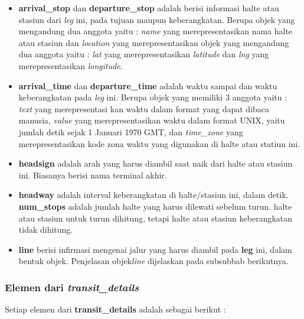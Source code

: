 \begin{itemize}
	\item \textbf{arrival\_stop} dan \textbf{departure\_stop} adalah berisi informasi halte atau stasiun dari \textit{leg} ini, pada tujuan maupun keberangkatan. Berupa objek yang mengandung dua anggota yaitu : \textit{name} yang merepresentasikan nama halte atau stasiun dan \textit{location} yang merepresentasikan objek yang mengandung dua anggota yaitu : \textit{lat} yang merepresentasikan \textit{latitude} dan \textit{lng} yang merepresentasikan \textit{longitude}.
	\item \textbf{arrival\_time} dan \textbf{departure\_time} adalah waktu sampai dan waktu keberangkatan pada \textit{leg} ini. Berupa objek yang memiliki 3 anggota yaitu : \textit{text} yang merepresentasi kan waktu dalam format yang dapat dibaca manusia, \textit{value} yang merepresentasikan waktu dalam format UNIX, yaitu jumlah detik sejak 1 Januari 1970 GMT, dan \textit{time\_zone} yang merepresentasikan kode zona waktu yang digunakan di halte atau statiun ini.
	\item \textbf{headsign} adalah arah yang harus diambil saat naik dari halte atau stasiun ini. Biasanya berisi nama terminal akhir.
	\item \textbf{headway} adalah interval keberangkatan di halte/stasiun ini, dalam detik.
	\textbf{num\_stops} adalah jumlah halte yang harus dilewati sebelum turun. halte atau stasiun untuk turun dihitung, tetapi halte atau stasiun keberangkatan tidak dihitung.
	\item \textbf{line} berisi infirmasi mengenai jalur yang harus diambil pada \textbf{leg} ini, dalam bentuk objek. Penjelasan objek\textit{line} dijelaskan pada subsubbab berikutnya.
\end{itemize}

\subsubsection{Elemen dari \textit{transit\_details}}
\label{subsubsec:elementransitdetail}

Setiap elemen dari \textbf{transit\_details} adalah sebagai berikut :

